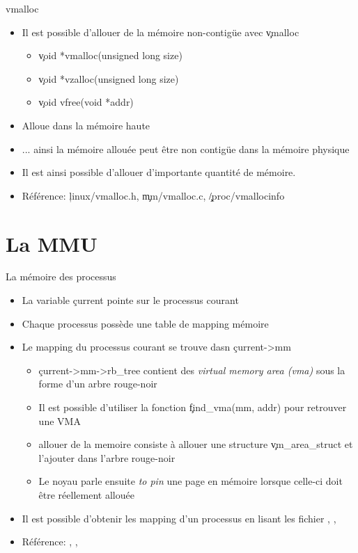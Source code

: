 \begin{frame}[fragile=singleslide]{vmalloc}
  \begin{itemize} 
  \item Il est possible d'allouer de la mémoire non-contigüe avec
    \c{vmalloc}
    \begin{itemize} 
    \item \c{void *vmalloc(unsigned long size)}
    \item \c{void *vzalloc(unsigned long size)}
    \item \c{void vfree(void *addr)}
    \end{itemize} 
  \item Alloue dans la mémoire haute
  \item ...  ainsi la mémoire allouée  peut être non  contigüe dans la
    mémoire physique
  \item  Il  est ainsi  possible  d'allouer  d'importante quantité  de
    mémoire.
  \item Référence: \c{linux/vmalloc.h}, \c{mm/vmalloc.c}, \c{/proc/vmallocinfo}
  \end{itemize} 
\end{frame}

\section{La MMU}

\begin{frame}[fragile=singleslide]{La mémoire des processus}
  \begin{itemize} 
  \item La variable \c{current} pointe sur le processus courant
  \item Chaque processus possède une table de mapping mémoire
  \item Le mapping du processus courant se trouve dasn \c{current->mm}
    \begin{itemize} 
    \item  \c{current->mm->rb_tree} contient des  \emph{virtual memory
        area (vma)} sous la forme d'un arbre rouge-noir
    \item     Il    est     possible     d'utiliser    la     fonction
      \c{find_vma(mm, addr)} pour retrouver une VMA
    \item  allouer de  la  memoire consiste  à  allouer une  structure
      \c{vm_area_struct} et l'ajouter dans l'arbre rouge-noir
    \item Le  noyau parle  ensuite \emph{to pin}  une page  en mémoire
      lorsque celle-ci doit être réellement allouée
    \end{itemize} 
  \item Il est possible d'obtenir les mapping d'un processus en lisant
    les   fichier   ,   ,
  \item         Référence:        ,
    , 
  \end{itemize} 
\end{frame} 

